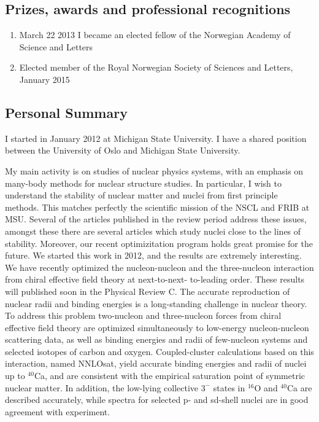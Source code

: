 \documentclass[prc,amsart,english,twocolumn,superscriptaddress,showpacs,floatfix]{revtex4}
\begin{document}
 \subsection*{Prizes, awards and professional recognitions}
\begin{enumerate}
\item March 22 2013 I became an elected fellow of the Norwegian Academy of Science and Letters
\item Elected member of the Royal Norwegian Society of Sciences and Letters, January 2015 \\
\end{enumerate}

\subsection*{Personal Summary}

I started in January 2012 at Michigan State University. I have a
shared position between the University of Oslo and Michigan State
University.

My main activity is on studies of nuclear physics systems, with an
emphasis on many-body methods for nuclear structure studies. In
particular, I wish to understand the stability of nuclear matter and
nuclei from first principle methods. This matches perfectly the
scientific mission of the NSCL and FRIB at MSU.  Several of the
articles published in the review period address these issues, amongst
these there are several articles which study
nuclei close to the lines of stability.  Moreover, our recent
optimizitation program holds great promise for the future.  We 
started this work in 2012, and the results are extremely interesting.  We
have recently optimized the nucleon-nucleon and the three-nucleon interaction from chiral
effective field theory at next-to-next- to-leading order. These results will published soon in the Physical Review C.
The accurate reproduction of nuclear radii and binding energies is a long-standing challenge in nuclear theory. To address this problem two-nucleon and three-nucleon forces from chiral effective field theory are optimized simultaneously to low-energy nucleon-nucleon scattering data, as well as binding energies and radii of few-nucleon systems and selected isotopes of carbon and oxygen. Coupled-cluster calculations based on this interaction, named NNLOsat, yield accurate binding energies and radii of nuclei up to $^{40}$Ca, and are consistent with the empirical saturation point of symmetric nuclear matter. In addition, the low-lying collective $3^-$ states in 
$^{16}$O and $^{40}$Ca are described accurately, while spectra for selected p- and sd-shell nuclei are in good agreement with experiment.
\end{document}

